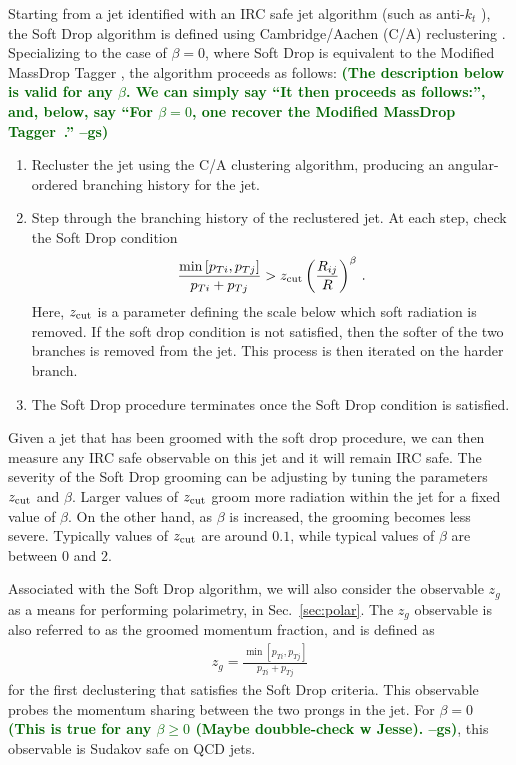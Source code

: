 \documentclass[11pt,letterpaper]{article}
\DeclareRobustCommand{\Sec}[1]{Sec.~\ref{#1}}
\newcommand{\zcut}{z_{\rm cut}}
\newcommand{\gs}[1]{\textbf{\textcolor{darkgreen}{(#1 --gs)}}}
\begin{document}
Starting from a jet identified with an IRC safe jet algorithm (such as
anti-$k_t$ \cite{Cacciari:2008gp}), the Soft Drop algorithm is defined
using Cambridge/Aachen (C/A) reclustering
\cite{Dokshitzer:1997in,Wobisch:1998wt,Wobisch:2000dk}.  Specializing
to the case of $\beta=0$, where Soft Drop is equivalent to the
Modified MassDrop Tagger \cite{Dasgupta:2013ihk}, the algorithm
proceeds as follows: \gs{The description below is valid for any
  $\beta$. We can simply say ``It then proceeds as follows:'', and,
  below, say ``For $\beta=0$, one recover the Modified MassDrop
  Tagger~\cite{Dasgupta:2013ihk}.''}
\begin{enumerate}

\item Recluster the jet using the C/A clustering algorithm, producing an angular-ordered branching history for the jet.

\item Step through the branching history of the reclustered jet.  At each step, check the Soft Drop condition
\begin{align}\label{eq:sd_cut}
\frac{\min\left[ p_{Ti}, p_{Tj}  \right]}{p_{Ti}+p_{Tj}}> \zcut \left(   \frac{R_{ij}}{R}\right)^\beta \,.
\end{align}
Here, $\zcut$ is a parameter defining the scale below which soft radiation is removed.  If the soft drop condition is not satisfied, then the softer of the two branches is removed from the jet.  This process is then iterated on the harder branch.

\item The Soft Drop procedure terminates once the Soft Drop condition is satisfied.

\end{enumerate}
Given a jet that has been groomed with the soft drop procedure, we can
then measure any IRC safe observable on this jet and it will remain
IRC safe. The severity of the Soft Drop grooming can be adjusting by
tuning the parameters $\zcut$ and $\beta$. Larger values of $\zcut$
groom more radiation within the jet for a fixed value of $\beta$. On
the other hand, as $\beta$ is increased, the grooming becomes less
severe. Typically values of $\zcut$ are around $0.1$, while typical
values of $\beta$ are between $0$ and $2$.




Associated with the Soft Drop algorithm, we will also consider the observable $z_g$ as a means for performing polarimetry, in \Sec{sec:polar}. The $z_g$ observable is also referred to as the groomed momentum fraction, and is defined as
\begin{align}
z_g=\frac{\min\left[ p_{Ti}, p_{Tj}  \right]}{p_{Ti}+p_{Tj}}
\end{align}
for the first declustering that satisfies the Soft Drop criteria. This
observable probes the momentum sharing between the two prongs in the
jet. For $\beta=0$ \gs{This is true for any $\beta\ge 0$ (Maybe
  doubble-check w Jesse).}, this observable is Sudakov safe on QCD
jets.
\end{document}
